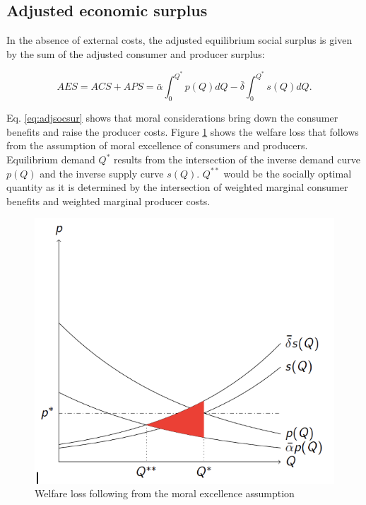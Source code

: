 \documentclass[
]{book}
\begin{document}
\hypertarget{adjusted-economic-surplus}{%
\subsection{Adjusted economic surplus}\label{adjusted-economic-surplus}}

In the absence of external costs, the adjusted equilibrium social surplus is given by the sum of the adjusted consumer and producer surplus:

\begin{equation}
  AES = ACS + APS = \bar{\alpha} \int_0^{Q^*} p(Q)dQ - \bar{\delta} \int_0^{Q^*} s(Q) dQ.
  \label{eq:adjsocsur}
\end{equation}

Eq. \eqref{eq:adjsocsur} shows that moral considerations bring down the consumer benefits and raise the producer costs. Figure \ref{fig:moralloss} shows the welfare loss that follows from the assumption of moral excellence of consumers and producers. Equilibrium demand \(Q^*\) results from the intersection of the inverse demand curve \(p(Q)\) and the inverse supply curve \(s(Q)\). \(Q^{**}\) would be the socially optimal quantity as it is determined by the intersection of weighted marginal consumer benefits and weighted marginal producer costs.

\begin{figure}
\includegraphics[width=7.5in]{./figures/moralloss} \caption{Welfare loss following from the moral excellence assumption}\label{fig:moralloss}
\end{figure}
\end{document}
